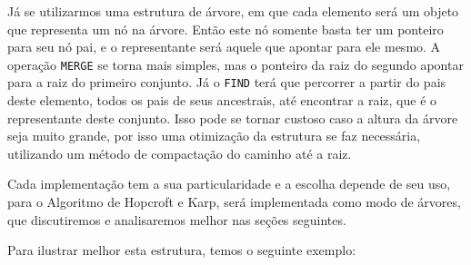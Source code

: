 \documentclass[
	12pt,				%
	openany,
	oneside,
	a4paper,			%
	english,			%
	brazil				%
	]{abntex2}
\begin{document}
  Já se utilizarmos uma estrutura de árvore, em que cada elemento será um objeto  que representa um nó na árvore. Então este nó somente basta ter um ponteiro para seu nó pai, e o representante será aquele que apontar para ele mesmo. A operação \texttt{MERGE} se torna mais simples, mas o ponteiro da raiz do segundo apontar para a raiz do primeiro conjunto. Já o \texttt{FIND} terá que percorrer a partir do pais deste elemento, todos os pais de seus ancestrais, até encontrar a raiz, que é o representante deste conjunto. Isso pode se tornar custoso caso a altura da árvore seja muito grande, por isso uma otimização da estrutura se faz necessária, utilizando um método de compactação do caminho até a raiz.

  Cada implementação tem a sua particularidade e a escolha depende de seu uso, para o Algoritmo de Hopcroft e Karp, será implementada como modo de árvores, que discutiremos e analisaremos melhor nas seções seguintes.

  Para ilustrar melhor esta estrutura, temos o seguinte exemplo:
\end{document}
